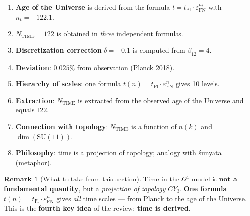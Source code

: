 \documentclass[11pt,a4paper]{article}
\newcommand{\SU}{\mathrm{SU}}
\newcommand{\CY}{CY_3}
\newcommand{\Om}{\Omega^4}
\newcommand{\epsFN}{\varepsilon_{\text{FN}}}
\theoremstyle{definition}
\newtheorem{remark}[theorem]{Remark}
\begin{document}
\begin{enumerate}
    \item \textbf{Age of the Universe} is derived from the formula 
          $t = t_{\text{Pl}} \cdot \epsFN^{n_t}$ with 
          $n_t = -122.1$.
    \item \textbf{$N_{\text{TIME}} = 122$} is obtained in \emph{three} 
          independent formulas.
    \item \textbf{Discretization correction} $\delta = -0.1$ 
          is computed from $\beta_{12} = 4$.
    \item \textbf{Deviation}: $0.025\%$ from observation 
          (Planck 2018).
    \item \textbf{Hierarchy of scales}: one formula 
          $t(n) = t_{\text{Pl}} \cdot \epsFN^n$ gives 10 levels.
    \item \textbf{Extraction}: $N_{\text{TIME}}$ is extracted 
          from the observed age of the Universe and equals $122$.
    \item \textbf{Connection with topology}: $N_{\text{TIME}}$ is a 
          function of $n(k)$ and $\dim(\SU(11))$.
    \item \textbf{Philosophy}: time is a projection of topology; 
          analogy with śūnyatā (metaphor).
\end{enumerate}

\begin{remark}[What to take from this section]
\label{rem:time-takeaway}
Time in the $\Om$ model is \textbf{not a fundamental quantity}, 
but a \emph{projection of topology} $\CY$. \textbf{One formula} 
$t(n) = t_{\text{Pl}} \cdot \epsFN^n$ gives \emph{all} time 
scales — from Planck to the age of the Universe. This is the 
\textbf{fourth key idea} of the review: \textbf{time is derived}.
\end{remark}
\end{document}

